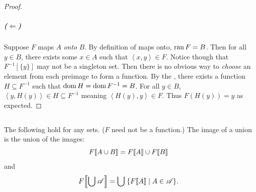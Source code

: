 \documentclass{report}
\begin{document}
\begin{proof}
    \subparagraph{($\Leftarrow$)}%

      Suppose $F$ maps $A$ \textit{onto} $B$.
      By definition of maps onto, $\mathop{\text{ran}}{F} = B$.
      Then for all $y \in B$, there exists some $x \in A$ such that
        $\left< x, y \right> \in F$.
      Notice though that $F^{-1}[\{y\}]$ may not be a singleton set.
      Then there is no obvious way to \textit{choose} an element from each
        preimage to form a function.
      By the , there exists a function
        $H \subseteq F^{-1}$ such that $\mathop{\text{dom}}{H} = \mathop{\text{dom}}{F^{-1}} = B$.
      For all $y \in B$, $\left< y, H(y) \right> \in H \subseteq F^{-1}$
        meaning $\left< H(y), y \right> \in F$.
      Thus $F(H(y)) = y$ as expected.

\end{proof}

\subsection{}%
\label{sub:theorem-3k-a}

\begin{theorem}[3K(a)]

  The following hold for any sets. ($F$ need not be a function.)
  The image of a union is the union of the images:
    \begin{equation}
      \label{sub:theorem-3k-a-eq1}
      F\!\left\llbracket A \cup B\right\rrbracket = F\!\left\llbracket A\right\rrbracket \cup F\!\left\llbracket B\right\rrbracket
    \end{equation}
    and
    \begin{equation}
      \label{sub:theorem-3k-a-eq2}
      F\!\left\llbracket\bigcup{\mathscr{A}}\right\rrbracket =
        \bigcup\;\{F\!\left\llbracket A\right\rrbracket \mid A \in \mathscr{A}\}.
    \end{equation}

\end{theorem}
\end{document}
